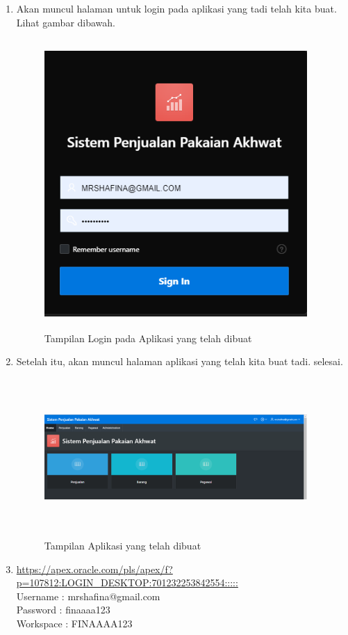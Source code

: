 \documentclass[a4paper, 12pt]{article}
\begin{document}
\begin{enumerate}
\item Akan muncul halaman untuk login pada aplikasi yang tadi telah kita buat. Lihat gambar dibawah.

            \begin{figure}[!htbp]
            \centering
            \includegraphics[width=10cm,height=11cm]{gambar/10-createapp.PNG}
            \caption{Tampilan Login pada Aplikasi yang telah dibuat}
            \label{penanda}
            \end{figure}
            
\item Setelah itu, akan muncul halaman aplikasi yang telah kita buat tadi. selesai.

            \begin{figure}[!htbp]
            \centering
            \includegraphics[width=10cm,height=6cm]{gambar/11-createapp.PNG}
            \caption{Tampilan Aplikasi yang telah dibuat}
            \label{penanda}
            \end{figure}
 
\item \url{https://apex.oracle.com/pls/apex/f?p=107812:LOGIN_DESKTOP:701232253842554:::::}\\
Username  : mrshafina@gmail.com\\
Password  : finaaaa123\\
Workspace : FINAAAA123

\end{enumerate}
\end{document}

